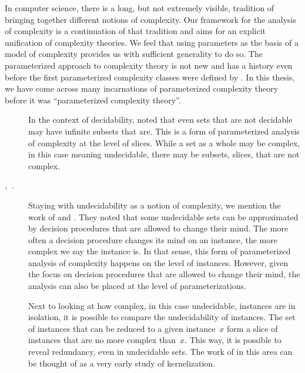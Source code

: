 In computer science, there is a long, but not extremely visible, tradition of bringing together different notions of complexity.
Our framework for the analysis of complexity is a continuation of that tradition and aims for an explicit unification of complexity theories.
We feel that using parameters as the basis of a model of complexity provides us with sufficient generality to do so.
The parameterized approach to complexity theory is not new and has a history even before the first parameterized complexity classes were defined by \textcite{downey1992fixed}.
In this thesis, we have come across many incarnations of parameterized complexity theory before it was \enquote{parameterized complexity theory}.
\newcommand{\yeartextcite}[2][]{\citeyear{#2}\textmd{\textit{,~\textcite{#1,#2}.}}}
\begin{description}
\item[\yeartextcite{post1944recursively}]
  In the context of decidability, \citeauthor{post1944recursively} noted that even sets that are not decidable may have infinite subsets that are.
  This is a form of parameterized analysis of complexity at the level of slices.
  While a set as a whole may be complex, in this case meaning undecidable, there may be subsets, slices, that are not complex.
\item[{\yeartextcite[putnam1965trial]{gold1965limiting}}]
  Staying with undecidability as a notion of complexity, we mention the work of \citeauthor{putnam1965trial} and \citeauthor{gold1965limiting}.
  They noted that some undecidable sets can be approximated by decision procedures that are allowed to change their mind.
  The more often a decision procedure changes its mind on an instance, the more complex we say the instance is.
  In that sense, this form of parameterized analysis of complexity happens on the level of instances.
  However, given the focus on decision procedures that are allowed to change their mind, the analysis can also be placed at the level of parameterizations.
\item[\yeartextcite{jockusch1968semirecursive}]
  Next to looking at how complex, in this case undecidable, instances are in isolation, it is possible to compare the undecidability of instances.
  The set of instances that can be reduced to a given instance~$x$ form a slice of instances that are no more complex than~$x$.
  This way, it is possible to reveal redundancy, even in undecidable sets.
  The work of \citeauthor{jockusch1968semirecursive} in this area can be thought of as a very early study of kernelization.
\item[\yeartextcite{flajolet1974sets}]

\end{description}
